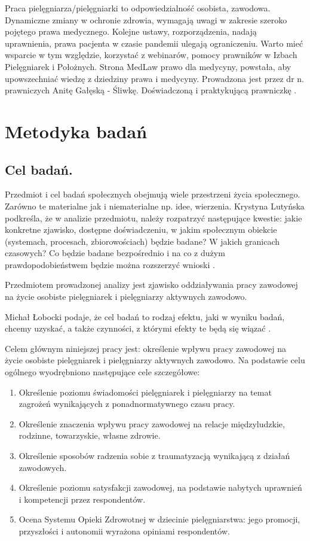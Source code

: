\documentclass[a4paper,12pt,twoside,openany]{report}
\begin{document}
Praca pielęgniarza/pielęgniarki to odpowiedzialność osobista, zawodowa. Dynamiczne zmiany w ochronie zdrowia, wymagają uwagi w zakresie szeroko pojętego prawa medycznego. Kolejne ustawy, rozporządzenia, nadają uprawnienia, prawa pacjenta w czasie pandemii ulegają ograniczeniu. Warto mieć wsparcie w tym względzie, korzystać z webinarów, pomocy prawników w Izbach Pielęgniarek i Położnych. Strona MedLaw prawo dla medycyny, powstała, aby upowszechniać wiedzę z dziedziny prawa i medycyny. Prowadzona jest przez dr n. prawniczych Anitę Gałęską - Śliwkę. Doświadczoną i praktykującą prawniczkę \cite{anita}.


\chapter{Metodyka badań}

\section{Cel badań.}
Przedmiot i cel badań społecznych obejmują wiele przestrzeni życia społecznego. Zarówno te materialne jak i niematerialne np. idee, wierzenia. Krystyna Lutyńska podkreśla, że w analizie przedmiotu, należy rozpatrzyć następujące kwestie: jakie konkretne zjawisko, dostępne doświadczeniu, w jakim społecznym obiekcie (systemach, procesach, zbiorowościach) będzie badane? W jakich granicach czasowych? Co będzie badane bezpośrednio i na co z dużym prawdopodobieństwem będzie można rozszerzyć wnioski \cite{krys}.

Przedmiotem prowadzonej analizy jest zjawisko oddziaływania pracy zawodowej na życie osobiste pielęgniarek i pielęgniarzy aktywnych zawodowo.

Michał Łobocki podaje, że cel badań to rodzaj efektu, jaki w wyniku badań, chcemy uzyskać, a także czynności, z którymi efekty te będą się wiązać \cite{mich}.

Celem głównym niniejszej pracy jest: określenie wpływu pracy zawodowej na życie osobiste pielęgniarek i pielęgniarzy aktywnych zawodowo.
Na podstawie celu ogólnego wyodrębniono następujące cele szczegółowe:
\begin{enumerate}
	\item Określenie poziomu świadomości pielęgniarek i pielęgniarzy na temat zagrożeń wynikających z ponadnormatywnego czasu pracy.
	\item Określenie znaczenia wpływu pracy zawodowej na relacje międzyludzkie, rodzinne, towarzyskie, własne zdrowie.
	\item Określenie sposobów radzenia sobie z traumatyzacją wynikającą z działań zawodowych.
	\item Określenie poziomu satysfakcji zawodowej, na podstawie nabytych uprawnień i kompetencji przez respondentów.
	\item Ocena Systemu Opieki Zdrowotnej w dziecinie pielęgniarstwa: jego promocji, przyszłości i autonomii wyrażona opiniami respondentów.
\end{enumerate}
\end{document}
